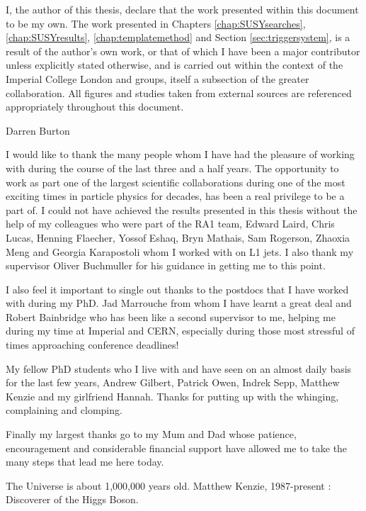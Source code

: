 \begin{declaration}
  I, the author of this thesis, declare that the work presented within this document to be my own.  The work presented in Chapters \ref{chap:SUSYsearches}, \ref{chap:SUSYresults},  \ref{chap:templatemethod} and Section \ref{sec:triggersystem}, is a result of the author's own work, or that of which I have been a major contributor unless explicitly stated otherwise, and is carried out within the context of the Imperial College London and \CERN \SUSY groups, itself a subsection of the greater \CMS collaboration.  All figures and studies taken from external sources are referenced appropriately throughout this document.
  
  \vspace*{1cm}
  \begin{flushright}
    Darren Burton
  \end{flushright}
\end{declaration}


\begin{acknowledgements}
  I would like to thank the many people whom I have had the pleasure of working with during the course of the last three and a half years. The opportunity to work as part one of the largest scientific collaborations during one of the most exciting times in particle physics for decades, has been a real privilege to be a part of. I could not have achieved the results presented in this thesis without the help of my colleagues who were part of the RA1 team, Edward Laird, Chris Lucas, Henning Flaecher, Yossof Eshaq, Bryn Mathais, Sam Rogerson, Zhaoxia Meng and Georgia Karapostoli whom I worked with on L1 jets. I also thank my supervisor Oliver Buchmuller for his guidance in getting me to this point. 
 
I also feel it important to single out thanks to the postdocs that I have worked with during my PhD. Jad Marrouche from whom I have learnt a great deal and Robert Bainbridge who has been like a second supervisor to me, helping me during my time at Imperial and CERN, especially during those most stressful of times approaching conference deadlines! 

My fellow PhD students who I live with and have seen on an almost daily basis for the last few years, Andrew Gilbert, Patrick Owen, Indrek Sepp, Matthew Kenzie and my girlfriend Hannah. Thanks for putting up with the whinging, complaining and clomping. 

Finally my largest thanks go to my Mum and Dad whose patience, encouragement and considerable financial support have allowed me to take the many steps that lead me here today. 
 
\end{acknowledgements}

\tableofcontents
\listoffigures
\listoftables
\newpage

\frontquote%
  {The Universe is about 1,000,000 years old.}%
  {Matthew Kenzie, 1987-present : Discoverer of the Higgs Boson.}
